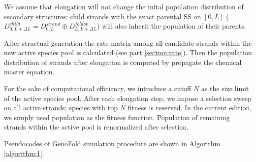 \documentclass[11pt, a4paper]{article}
\begin{document}
We assume that elongation will not change the inital population distribution
of secondary structures: child strands with the exact parental SS on $[0, L]$ ($D^{child}_{0, L+\Delta L} = D^{strand}_{0, L} \oplus D^{foldon}_{L, L+\Delta L}$) will also inherit the population of their parents.

After structual generation the rate matrix among all candidate strands within the new active species pool is calculated (see part \ref{section:rate}). Then the population
distribution of strands after elongation is computed by propagate the chemical master equation.

For the sake of computational efficiency, we introduce a cutoff $N $ as the size limit of the active species pool. After each elongation step, we impose a selection sweep on all active
strands; species with top $N $ fitness is reserved. In the current edition, we simply used population as the fitness function. Population of remaining strands within
the active pool is renormalized after selection.

Pseudocodes of GenoFold simulation procedure are shown in Algorithm \ref{algorithm:1}.
\end{document}

